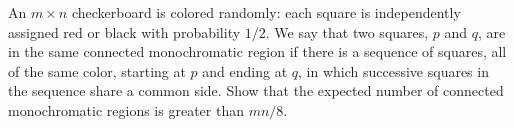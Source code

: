 An $m \times n$ checkerboard is colored randomly: each square is
independently
assigned red or black with probability $1/2$. We say that two squares,
$p$ and $q$,  are in the same connected monochromatic region if there is
a sequence of squares, all of the same color, starting at $p$ and ending
at $q$, in which successive squares in the sequence share a common side.
Show that the expected number of connected monochromatic regions is
greater than $m n / 8$.
